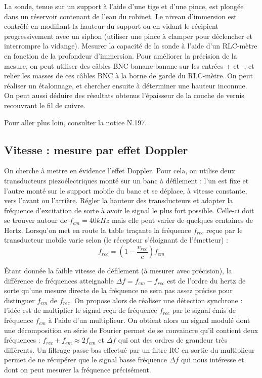 \documentclass{article}%
\begin{document}
La sonde, tenue sur un support à l'aide d'une tige et d'une pince, est plongée dans un réservoir contenant de l'eau du robinet. Le niveau d'immersion est contrôlé en modifiant la hauteur du support ou en vidant le récipient progressivement avec un siphon (utiliser une pince à clamper pour déclencher et interrompre la vidange). Mesurer la capacité de la sonde à l'aide d'un RLC-mètre en fonction de la profondeur d'immersion. Pour améliorer la précision de la mesure, on peut utiliser des câbles BNC banane-banane sur les entrées + et -, et relier les masses de ces câbles BNC à la borne de garde du RLC-mètre. On peut réaliser un étalonnage, et chercher ensuite à déterminer une hauteur inconnue. On peut aussi déduire des résultats obtenus l'épaisseur de la couche de vernis recouvrant le fil de cuivre.

Pour aller plus loin, consulter la notice N.197. 

\subsection{Vitesse : mesure par effet Doppler}

On cherche à mettre en évidence l'effet Doppler. Pour cela, on utilise deux transducteurs piezoélectriques monté sur un banc à défilement : l'un est fixe et l'autre monté sur le support mobile du banc et se déplace, à vitesse constante, vers l'avant ou l'arrière. Régler la hauteur des transducteurs et adapter la fréquence d'excitation de sorte à avoir le signal le plus fort possible. Celle-ci doit se trouver autour de $f_{em}= 40 kHz$ mais elle peut varier de quelques centaines de Hertz. Lorsqu'on met en route la table traçante la fréquence $f_{rec}$ reçue par le transducteur mobile varie selon (le récepteur s'éloignant de l'émetteur) :
\[f_{rec} = \left(1 - \frac{v_{rec}}{c}\right) f_{em}\]

Étant donnée la faible vitesse de défilement (à mesurer avec précision), la différence de fréquences atteignable $\Delta f=f_{em}-f_{rec}$ est de l'ordre du hertz de sorte qu'une mesure directe de la fréquence ne sera pas assez précise pour distinguer $f_{em}$ de $f_{rec}$. On propose alors de réaliser une détection synchrone : l'idée est de multiplier le signal reçu de fréquence $f_{rec}$ par le signal émis de fréquence $f_{em}$ à l'aide d'un multiplieur. On obtient alors un signal modulé dont une décomposition en série de Fourier permet de se convaincre qu'il contient deux fréquences : $f_{rec}+f_{em}\approx 2f_{em}$ et $\Delta f$ qui ont des ordres de grandeur très différents. Un filtrage passe-bas effectué par un filtre RC en sortie du multiplieur permet de ne récupérer que le signal basse fréquence $\Delta f$ qui nous intéresse et dont on peut mesurer la fréquence précisément.
\end{document}
